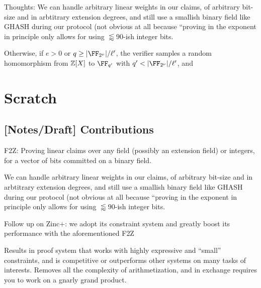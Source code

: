 \documentclass[11pt,letterpaper,usenames,dvipsnames]{article}
\begin{document}
Thoughts: We can handle arbitrary linear weights in our claims, of arbitrary bit-size and in arbtitrary extension degrees, and still use a smallish binary field like GHASH during our protocol (not obvious at all because ``proving in the exponent in principle only allows for using $\lessapprox 90$-ish integer bits. 



Otherwise, if $e>0$ or $q\geq|\comfield|/\codedim'$, 
         the verifier samples a random homomorphism from $\mathbb{Z}[X]$ to $\FF_{q'}$ with $q'< |\comfield|/\codedim'$, and 


















\section{Scratch}

\subsection{[Notes/Draft] Contributions}

F2Z: Proving linear claims over any field (possibly an extension field) or integers, for a vector of bits committed on a binary field. 

We can handle arbitrary linear weights in our claims, of arbitrary bit-size and in arbtitrary extension degrees, and still use a smallish binary field like GHASH during our protocol (not obvious at all because ``proving in the exponent in principle only allows for using $\lessapprox 90$-ish integer bits. 

Follow up  on Zinc+: we adopt its constraint system and greatly boost its performance with the aforementioned F2Z

Results in proof system that works with highly expressive and ``small'' constraints, and is competitive or outperforms other systems on many tasks of interests.  Removes all the complexity of arithmetization, and in exchange requires you to work on a gnarly grand product.
\end{document}
